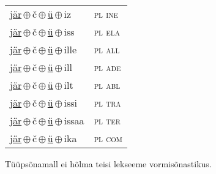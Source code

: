 \begin{minipage}{\textwidth}
\begin{sideways}
\begin{tabular}{l l}
\underline{jär}\,$\oplus$\,č\,$\oplus$\,\underline{ü}\,$\oplus$\,iz & \textsc{ pl ine } \\
\underline{jär}\,$\oplus$\,č\,$\oplus$\,\underline{ü}\,$\oplus$\,iss & \textsc{ pl ela } \\
\underline{jär}\,$\oplus$\,č\,$\oplus$\,\underline{ü}\,$\oplus$\,ille & \textsc{ pl all } \\
\underline{jär}\,$\oplus$\,č\,$\oplus$\,\underline{ü}\,$\oplus$\,ill & \textsc{ pl ade } \\
\underline{jär}\,$\oplus$\,č\,$\oplus$\,\underline{ü}\,$\oplus$\,ilt & \textsc{ pl abl } \\
\underline{jär}\,$\oplus$\,č\,$\oplus$\,\underline{ü}\,$\oplus$\,issi & \textsc{ pl tra } \\
\underline{jär}\,$\oplus$\,č\,$\oplus$\,\underline{ü}\,$\oplus$\,issaa & \textsc{ pl ter } \\
\underline{jär}\,$\oplus$\,č\,$\oplus$\,\underline{ü}\,$\oplus$\,ika & \textsc{ pl com } \\
\end{tabular}
\end{sideways}
\label{tab:tüüpsõnamall-järčü}

\end{minipage}

 
\vspace{1em}
\noindent Tüüpsõnamall  ei hõlma teisi lekseeme vormi\-sõnastikus.
